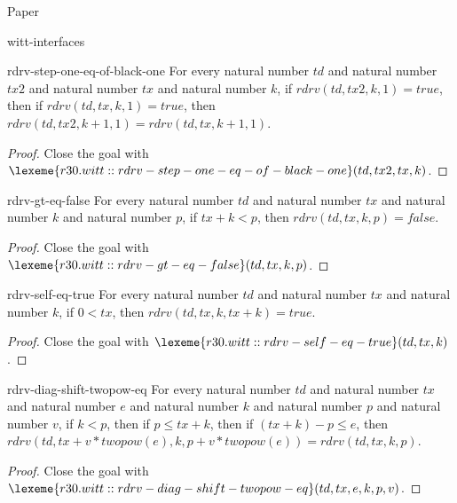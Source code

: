 \begin{lexlean}{Paper}
\begin{section}{witt-interfaces}
  \begin{theorem}{rdrv-step-one-eq-of-black-one}
  For every natural number \(td\) and natural number \(tx2\) and natural number \(tx\) and natural number \(k\), if \(rdrv(td, tx2, k, 1) = true\), then if \(rdrv(td, tx, k, 1) = true\), then \(rdrv(td, tx2, k + 1, 1) = rdrv(td, tx, k + 1, 1)\).
  \begin{proof}
  Close the goal with \(\lexeme{r30.witt::rdrv-step-one-eq-of-black-one}(td, tx2, tx, k)\).
  \end{proof}
  \end{theorem}

  \begin{theorem}{rdrv-gt-eq-false}
  For every natural number \(td\) and natural number \(tx\) and natural number \(k\) and natural number \(p\), if \(tx + k < p\), then \(rdrv(td, tx, k, p) = false\).
  \begin{proof}
  Close the goal with \(\lexeme{r30.witt::rdrv-gt-eq-false}(td, tx, k, p)\).
  \end{proof}
  \end{theorem}

  \begin{theorem}{rdrv-self-eq-true}
  For every natural number \(td\) and natural number \(tx\) and natural number \(k\), if \(0 < tx\), then \(rdrv(td, tx, k, tx + k) = true\).
  \begin{proof}
  Close the goal with \(\lexeme{r30.witt::rdrv-self-eq-true}(td, tx, k)\).
  \end{proof}
  \end{theorem}

  \begin{theorem}{rdrv-diag-shift-twopow-eq}
  For every natural number \(td\) and natural number \(tx\) and natural number \(e\) and natural number \(k\) and natural number \(p\) and natural number \(v\), if \(k < p\), then if \(p ≤ tx + k\), then if \((tx + k) - p ≤ e\), then \(rdrv(td, tx + v * twopow(e), k, p + v * twopow(e)) = rdrv(td, tx, k, p)\).
  \begin{proof}
  Close the goal with \(\lexeme{r30.witt::rdrv-diag-shift-twopow-eq}(td, tx, e, k, p, v)\).
  \end{proof}
  \end{theorem}


\end{section}
\end{lexlean}
